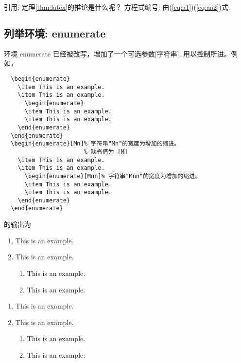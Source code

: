 \documentclass[12pt,openright]{book}
\begin{document}
引用:   定理\ref{thm:latex}的推论是什么呢？
方程式编号:  由(\ref{eq:a1})(\ref{eq:aa2})式.

\subsection{列举环境:  enumerate}

环境 enumerate 已经被改写，增加了一个可选参数[字符串], 用以控制所进。例如，
\begin{verbatim}
  \begin{enumerate}
    \item This is an example.
    \item This is an example.
      \begin{enumerate}
      \item This is an example.
      \item This is an example.
    \end{enumerate}
  \end{enumerate}
  \begin{enumerate}[Mn]% 字符串"Mn"的宽度为增加的缩进。
                       % 缺省值为 [M]
    \item This is an example.
    \item This is an example.
      \begin{enumerate}[Mnn]% 字符串"Mnn"的宽度为增加的缩进。
      \item This is an example.
      \item This is an example.
    \end{enumerate}
  \end{enumerate}
\end{verbatim}
的输出为
  \begin{enumerate}
    \item This is an example.
    \item This is an example.
      \begin{enumerate}
      \item This is an example.
      \item This is an example.
    \end{enumerate}
  \end{enumerate}
  \begin{enumerate}[Mn]%
    \item This is an example.
    \item This is an example.
      \begin{enumerate}[Mnn]%
      \item This is an example.
      \item This is an example.
    \end{enumerate}
  \end{enumerate}
\end{document}
